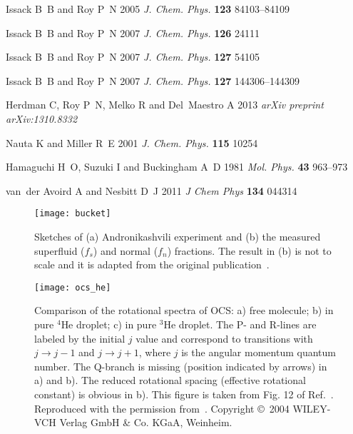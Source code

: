 \documentclass[12pt]{iopart}
\begin{document}
\begin{thebibliography}{100}
Issack B~B and Roy P~N 2005 {\em J. Chem. Phys.\/} {\bf 123} 84103--84109

Issack B~B and Roy P~N 2007 {\em J. Chem. Phys.\/} {\bf 126} 24111

Issack B~B and Roy P~N 2007 {\em J. Chem. Phys.\/} {\bf 127} 54105

Issack B~B and Roy P~N 2007 {\em J. Chem. Phys.\/} {\bf 127} 144306--144309

Herdman C, Roy P~N, Melko R and Del~Maestro A 2013 {\em arXiv preprint
  arXiv:1310.8332\/}

Nauta K and Miller R~E 2001 {\em J. Chem. Phys.\/} {\bf 115} 10254

Hamaguchi H~O, Suzuki I and Buckingham A~D 1981 {\em Mol. Phys.\/} {\bf 43}
  963--973

van~der Avoird A and Nesbitt D~J 2011 {\em J Chem Phys\/} {\bf 134} 044314

\end{thebibliography}



\clearpage

\begin{figure}[h]
\centerline {\texttt{[image: bucket]}}
\caption{Sketches of (a) Andronikashvili experiment and (b) the measured superfluid ($f_s$) and normal ($f_n$) fractions. The result in (b) is not to scale and it is adapted from the original publication~\cite{andron_bucket_1}. }
\label{fig:bucket}
\end{figure}

\begin{figure}[h] 
\centerline {\texttt{[image: ocs\_he]}}
\caption{Comparison of the rotational spectra of OCS: a) free molecule; b) in pure $^4$He droplet; c) in pure $^3$He droplet. The P- and R-lines are labeled by the initial $j$ value and correspond to transitions with $j\rightarrow j-1$ and $j\rightarrow j+1$, where $j$ is the angular momentum quantum number. The Q-branch is missing (position indicated by arrows) in a) and b). The reduced rotational spacing (effective rotational constant) is obvious in b). This figure is taken from Fig. 12 of Ref.~\cite{vilesov_acie}. Reproduced with the permission from~\cite{vilesov_acie}. Copyright \copyright~2004 WILEY-VCH Verlag GmbH \& Co. KGaA, Weinheim.}
\label{fig:ocs_he_grebenev}
\end{figure}
\end{document}
